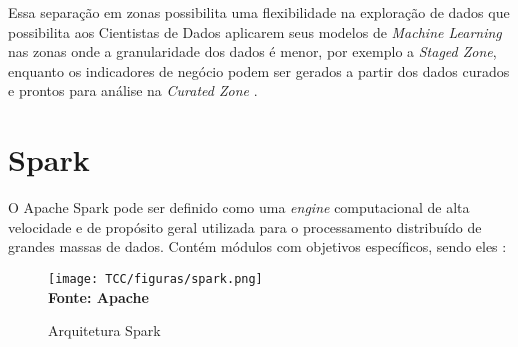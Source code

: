  Essa separação em zonas possibilita uma flexibilidade na exploração de dados que possibilita aos Cientistas de Dados aplicarem seus modelos de \textit{Machine Learning} nas zonas onde a granularidade dos dados é menor, por exemplo a \textit{Staged Zone}, enquanto os indicadores de negócio podem ser gerados a partir dos dados curados e prontos para análise na \textit{Curated Zone} \cite{datalakeforenterprises}.

\section{Spark} O Apache Spark pode ser definido como uma \textit{engine} computacional de alta velocidade e de propósito geral utilizada para o processamento distribuído de grandes massas de dados. Contém módulos com objetivos específicos, sendo eles \cite{learningspark}:

\begin{figure}[!ht]
	\centering	
	\caption[\hspace{0.1cm} Spark]{Arquitetura Spark}
	  \vspace{-0.4cm}
	\texttt{[image: TCC/figuras/spark.png]}
	 \vspace{-0.3cm}
	\\\textbf{\footnotesize Fonte: Apache}
	\label{fig:tela1}
\end{figure}

